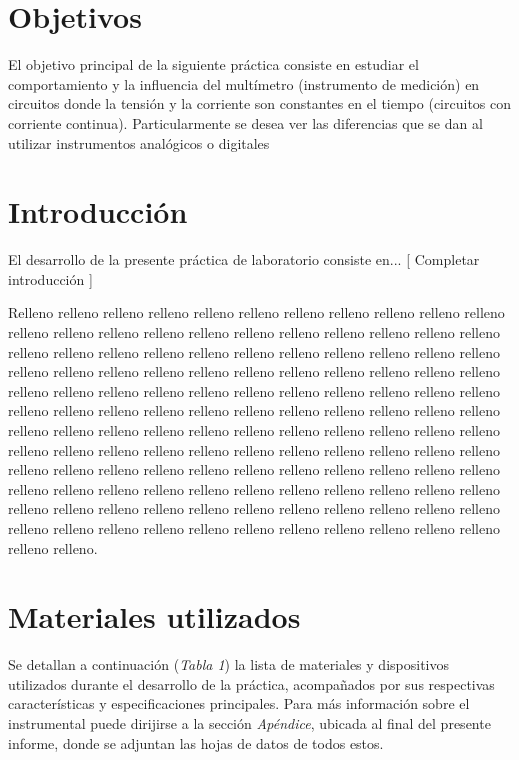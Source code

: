 \documentclass{article}
\begin{document}
\section{Objetivos}

	El objetivo principal de la siguiente práctica consiste en estudiar el comportamiento y la influencia del multímetro (instrumento de medición) en circuitos donde la tensión y la corriente son constantes en el tiempo (circuitos con corriente continua). Particularmente se desea ver las diferencias que se dan al utilizar instrumentos analógicos o digitales




\section{Introducción}

	El desarrollo de la presente práctica de laboratorio consiste en... [ Completar introducción ]
	\par
	Relleno relleno relleno relleno relleno relleno relleno relleno relleno relleno relleno relleno relleno relleno relleno relleno relleno relleno relleno relleno relleno relleno relleno relleno relleno relleno relleno relleno relleno relleno relleno relleno relleno relleno relleno relleno relleno relleno relleno relleno relleno relleno relleno relleno relleno relleno relleno relleno relleno relleno relleno relleno relleno relleno relleno relleno relleno relleno relleno relleno relleno relleno relleno relleno relleno relleno relleno relleno relleno relleno relleno relleno relleno relleno relleno relleno relleno relleno relleno relleno relleno relleno relleno relleno relleno relleno relleno relleno relleno relleno relleno relleno relleno relleno relleno relleno relleno relleno relleno relleno relleno relleno relleno relleno relleno relleno relleno relleno relleno relleno relleno relleno relleno relleno relleno relleno relleno relleno relleno relleno relleno relleno relleno relleno relleno relleno relleno relleno relleno relleno relleno relleno relleno relleno.

\bigskip\bigskip




\section{Materiales utilizados}

	Se detallan a continuación (\textit{Tabla 1}) la lista de materiales y dispositivos utilizados durante el desarrollo de la práctica, acompañados por sus respectivas características y especificaciones principales. Para más información sobre el instrumental puede dirijirse a la sección \textit{Apéndice}, ubicada al final del presente informe, donde se adjuntan las hojas de datos de todos estos.
\bigskip\bigskip
\end{document}
